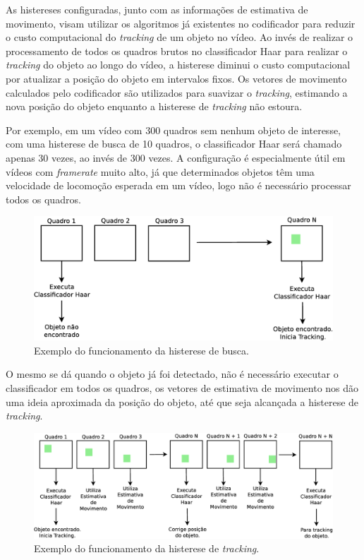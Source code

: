 As histereses configuradas, junto com as informações de estimativa de movimento, visam utilizar os algoritmos já existentes no codificador para reduzir o custo computacional do \textit{tracking} de um objeto no vídeo. Ao invés de realizar o processamento de todos os quadros brutos no classificador Haar para realizar o \textit{tracking} do objeto ao longo do vídeo, a histerese diminui o custo computacional por atualizar a posição do objeto em intervalos fixos. Os vetores de movimento calculados pelo codificador são utilizados para suavizar o \textit{tracking}, estimando a nova posição do objeto enquanto a histerese de \textit{tracking} não estoura.

Por exemplo, em um vídeo com 300 quadros sem nenhum objeto de interesse, com uma histerese de busca de 10 quadros, o classificador Haar será chamado apenas 30 vezes, ao invés de 300 vezes. A configuração é especialmente útil em vídeos com \textit{framerate} muito alto, já que determinados objetos têm uma velocidade de locomoção esperada em um vídeo, logo não é necessário processar todos os quadros.

\begin{figure}[H]
\centering
\includegraphics[scale=0.4]{imagens/fig23.eps}
\caption{Exemplo do funcionamento da histerese de busca.}
\label{fig:search_histeresys_example}
\end{figure}

O mesmo se dá quando o objeto já foi detectado, não é necessário executar o classificador em todos os quadros, os vetores de estimativa de movimento nos dão uma ideia aproximada da posição do objeto, até que seja alcançada a histerese de \textit{tracking}.

\begin{figure}[H]
\centering
\includegraphics[scale=0.3]{imagens/fig24.eps}
\caption{Exemplo do funcionamento da histerese de \textit{tracking}.}
\label{fig:tracking_histeresys_example}
\end{figure}


